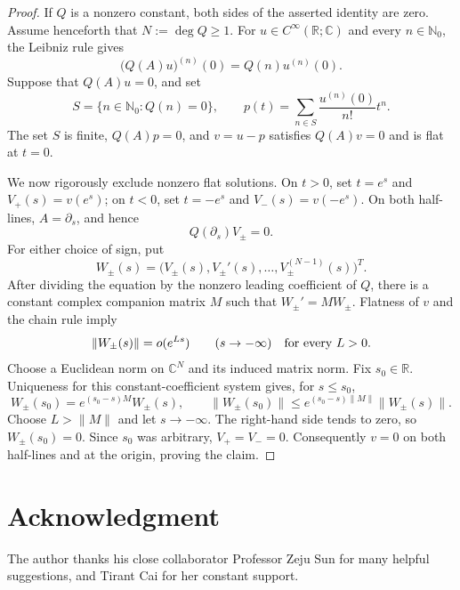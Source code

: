 \documentclass{tCON2e}
\newenvironment{revision}{\begingroup\color{black}}{\endgroup}
\numberwithin{equation}{section}
\theoremstyle{journalplain}
\theoremstyle{journaldef}
\newenvironment{revision}{}{}
\begin{document}
\begin{revision}
\begin{proof}
If $Q$ is a nonzero constant, both sides of the asserted identity are zero.
Assume henceforth that $N:=\deg Q\ge1$.
For $u\in C^\infty(\mathbb R;\mathbb C)$ and every $n\in\mathbb N_0$, the Leibniz rule gives
\[
 \bigl(Q(A)u\bigr)^{(n)}(0)=Q(n)u^{(n)}(0).
\]
Suppose that $Q(A)u=0$, and set
\[
 S=\{n\in\mathbb N_0:Q(n)=0\},
 \qquad
 p(t)=\sum_{n\in S}\frac{u^{(n)}(0)}{n!}t^n.
\]
The set $S$ is finite, $Q(A)p=0$, and $v=u-p$ satisfies $Q(A)v=0$ and is
flat at $t=0$.

We now rigorously exclude nonzero flat solutions. On $t>0$, set $t=e^s$
and $V_+(s)=v(e^s)$; on $t<0$, set $t=-e^s$ and
$V_-(s)=v(-e^s)$. On both half-lines, $A=\partial_s$, and hence
\[
 Q(\partial_s)V_\pm=0.
\]
For either choice of sign, put
\[
W_\pm(s)=\bigl(V_\pm(s),V_\pm'(s),\ldots,V_\pm^{(N-1)}(s)\bigr)^T.
\]
After dividing the equation by the nonzero leading coefficient of $Q$,
there is a constant complex companion matrix $M$ such that
$W_\pm'=MW_\pm$. Flatness of $v$ and the chain rule imply
\[
\|W_\pm(s)\|=o(e^{Ls})\qquad(s\to-\infty)
\quad\hbox{for every }L>0.
\]
Choose a Euclidean norm on $\mathbb C^N$ and its induced matrix norm.
Fix $s_0\in\mathbb R$. Uniqueness for this constant-coefficient system gives,
for $s\le s_0$,
\[
W_\pm(s_0)=e^{(s_0-s)M}W_\pm(s),
\qquad
\|W_\pm(s_0)\|
\le e^{(s_0-s)\|M\|}\|W_\pm(s)\|.
\]
Choose $L>\|M\|$ and let $s\to-\infty$. The right-hand side tends to zero,
so $W_\pm(s_0)=0$. Since $s_0$ was arbitrary, $V_+=V_-=0$.
Consequently $v=0$ on both half-lines and at the origin, proving the claim.
\end{proof}


\end{revision}

\section*{Acknowledgment}
The author thanks his close collaborator Professor Zeju Sun for many
helpful suggestions, and Tirant Cai for her constant support.



\end{document}
